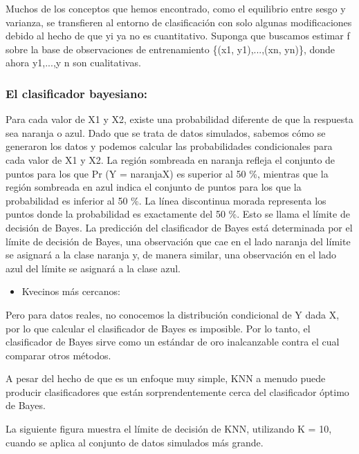 \documentclass[
  letterpaper,
  DIV=11,
  numbers=noendperiod]{scrartcl}
\providecommand{\tightlist}{%
  \setlength{\itemsep}{0pt}\setlength{\parskip}{0pt}}\usepackage{longtable,booktabs,array}
\begin{document}
Muchos de los conceptos que hemos encontrado, como el equilibrio entre
sesgo y varianza, se transfieren al entorno de clasificación con solo
algunas modificaciones debido al hecho de que yi ya no es cuantitativo.
Suponga que buscamos estimar f sobre la base de observaciones de
entrenamiento \{(x1, y1),...,(xn, yn)\}, donde ahora y1,...,y n son
cualitativas.

\hypertarget{el-clasificador-bayesiano}{%
\subsubsection{\texorpdfstring{\textbf{El clasificador
bayesiano:}}{El clasificador bayesiano:}}\label{el-clasificador-bayesiano}}

Para cada valor de X1 y X2, existe una probabilidad diferente de que la
respuesta sea naranja o azul. Dado que se trata de datos simulados,
sabemos cómo se generaron los datos y podemos calcular las
probabilidades condicionales para cada valor de X1 y X2. La región
sombreada en naranja refleja el conjunto de puntos para los que Pr (Y =
naranja\textbar X) es superior al 50 \%, mientras que la región
sombreada en azul indica el conjunto de puntos para los que la
probabilidad es inferior al 50 \%. La línea discontinua morada
representa los puntos donde la probabilidad es exactamente del 50 \%.
Esto se llama el límite de decisión de Bayes. La predicción del
clasificador de Bayes está determinada por el límite de decisión de
Bayes, una observación que cae en el lado naranja del límite se asignará
a la clase naranja y, de manera similar, una observación en el lado azul
del límite se asignará a la clase azul.

\begin{itemize}
\tightlist
\item
  Kvecinos más cercanos:
\end{itemize}

Pero para datos reales, no conocemos la distribución condicional de Y
dada X, por lo que calcular el clasificador de Bayes es imposible. Por
lo tanto, el clasificador de Bayes sirve como un estándar de oro
inalcanzable contra el cual comparar otros métodos.

A pesar del hecho de que es un enfoque muy simple, KNN a menudo puede
producir clasificadores que están sorprendentemente cerca del
clasificador óptimo de Bayes.

La siguiente figura muestra el límite de decisión de KNN, utilizando K =
10, cuando se aplica al conjunto de datos simulados más grande.
\end{document}
